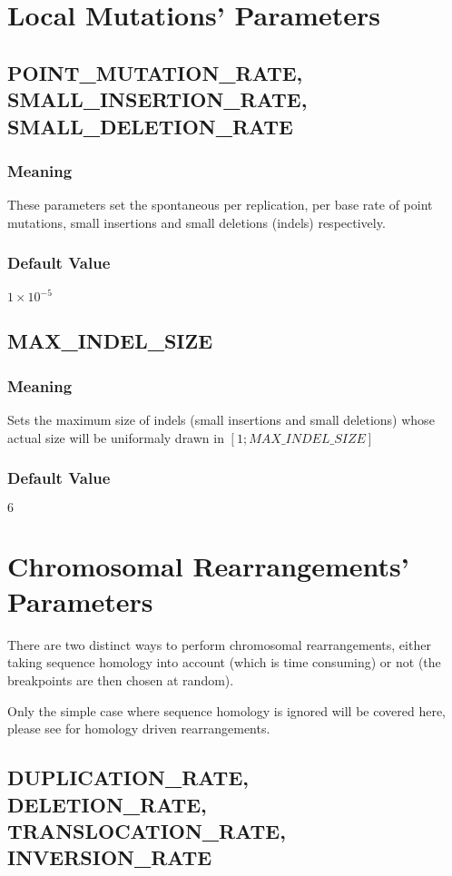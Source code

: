 \section{Local Mutations' Parameters}

\subsection{POINT\_MUTATION\_RATE, \\SMALL\_INSERTION\_RATE, \\SMALL\_DELETION\_RATE}
\subsubsection{Meaning}
These parameters set the spontaneous per replication, per base rate of point mutations, small insertions and small deletions (indels) respectively.
\subsubsection{Default Value}
$1\times{}10^{-5}$

\subsection{MAX\_INDEL\_SIZE}
\subsubsection{Meaning}
Sets the maximum size of indels (small insertions and small deletions) whose actual size will be uniformaly drawn in $[1;MAX\_INDEL\_SIZE]$
\subsubsection{Default Value}
$6$



\section{Chromosomal Rearrangements' Parameters}

There are two distinct ways to perform chromosomal rearrangements, either taking sequence homology into account (which is time consuming) or not (the breakpoints are then chosen at random).

Only the simple case where sequence homology is ignored will be covered here, please see \cite{} for homology driven rearrangements.

\subsection{DUPLICATION\_RATE, \\DELETION\_RATE, \\TRANSLOCATION\_RATE, INVERSION\_RATE}
